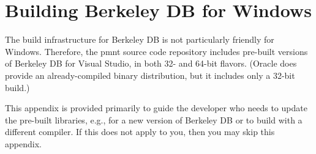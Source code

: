 
\chapter{Building Berkeley DB for Windows}
\label{chapter-building-bdb-for-windows}

The build infrastructure for Berkeley DB is not particularly friendly for Windows.  Therefore, the \ac{pmnt} source code repository includes pre-built versions of Berkeley DB for Visual Studio, in both 32- and 64-bit flavors.  (Oracle does provide an already-compiled binary distribution, but it includes only a 32-bit build.)

This appendix is provided primarily to guide the developer who needs to update the pre-built libraries, e.g., for a new version of Berkeley DB or to build with a different compiler.  If this does not apply to you, then you may skip this appendix.

